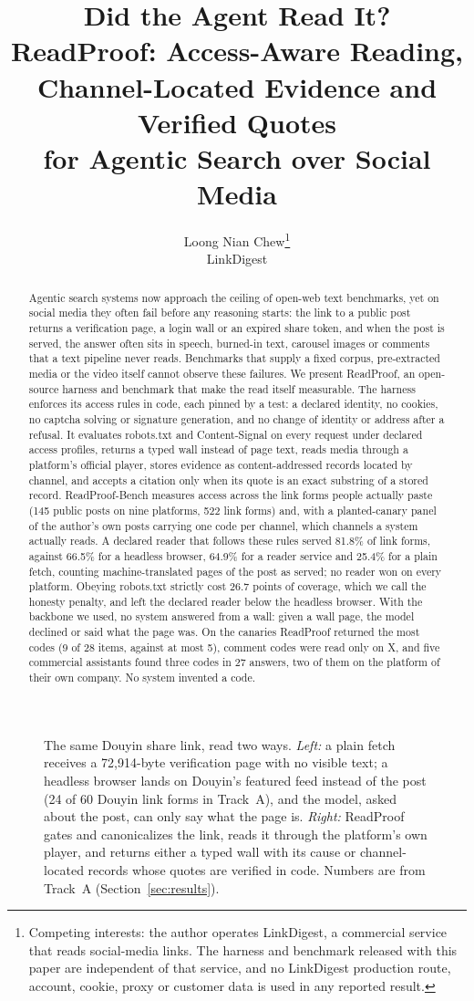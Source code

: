 \documentclass[11pt]{article}
\title{\textbf{Did the Agent Read It?}\\[4pt]
  \large ReadProof: Access-Aware Reading, Channel-Located Evidence and Verified Quotes\\
  for Agentic Search over Social Media}
\author{Loong Nian Chew\thanks{Competing interests: the author operates LinkDigest, a commercial service that
  reads social-media links. The harness and benchmark released with this paper are independent of that
  service, and no LinkDigest production route, account, cookie, proxy or customer data is used in any
  reported result.}\\[2pt] LinkDigest}
\date{\small\PaperDate}
\newcommand{\rpfigure}[1]{\IfFileExists{figures/#1.tex}{}%
  {\fbox{\parbox{0.8\textwidth}{\centering\ttfamily figures/\detokenize{#1}.tex is missing}}}}
\begin{document}
\maketitle

\begin{figure}[!ht]
\centering
\rpfigure{fig_teaser}
\caption{The same Douyin share link, read two ways. \emph{Left:} a plain fetch receives a 72{,}914-byte
verification page with no visible text; a headless browser lands on Douyin's featured feed instead of the post
(24 of 60 Douyin link forms in Track~A), and the model, asked about the post, can only say what the page is.
\emph{Right:} ReadProof gates and canonicalizes the link, reads it through the platform's own player, and
returns either a typed wall with its cause or channel-located records whose quotes are verified in code.
Numbers are from Track~A (Section~\ref{sec:results}).}
\label{fig:teaser}
\end{figure}

\begin{abstract}
\noindent Agentic search systems now approach the ceiling of open-web text benchmarks, yet on social media
they often fail before any reasoning starts: the link to a public post returns a verification page, a login
wall or an expired share token, and when the post is served, the answer often sits in speech, burned-in text,
carousel images or comments that a text pipeline never reads. Benchmarks that supply a fixed corpus,
pre-extracted media or the video itself cannot observe these failures. We present ReadProof, an open-source
harness and benchmark that make the read itself measurable. The harness enforces its access rules in code,
each pinned by a test: a declared identity, no cookies, no captcha solving or signature generation, and no
change of identity or address after a refusal. It evaluates robots.txt and Content-Signal on every request
under declared access profiles, returns a typed wall instead of page text, reads media through a platform's
official player, stores evidence as content-addressed records located by channel, and accepts a citation only
when its quote is an exact substring of a stored record. ReadProof-Bench measures access across the link forms
people actually paste (145 public posts on nine platforms, 522 link forms) and, with a planted-canary panel of the
author's own posts carrying one code per channel, which channels a system actually reads. A declared reader that
follows these rules served 81.8\% of link forms, against 66.5\% for a headless browser, 64.9\% for a reader service
and 25.4\% for a plain fetch, counting machine-translated pages of the post as served; no reader won on every
platform. Obeying robots.txt strictly cost 26.7 points of coverage, which we call the honesty penalty, and left the
declared reader below the headless browser. With the backbone we used, no system answered from a wall: given a wall
page, the model declined or said what the page was. On the canaries ReadProof returned the most codes (9 of 28 items,
against at most 5), comment codes were read only on X, and five commercial assistants found three codes in 27
answers, two of them on the platform of their own company. No system invented a code.
\end{abstract}
\end{document}
